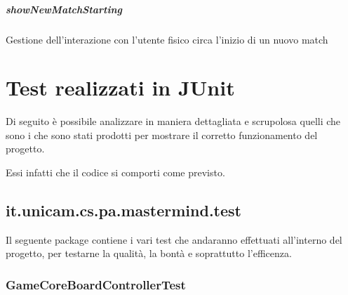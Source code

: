 \documentclass[letterpaper,10pt,italian,openany,oneside]{sphinxmanual}
\begin{document}
\paragraph{showNewMatchStarting}
\label{\detokenize{source/it/unicam/cs/pa/mastermind/ui/StartView:shownewmatchstarting}}

\begin{fulllineitems}
\label{\detokenize{source/it/unicam/cs/pa/mastermind/ui/StartView:it.unicam.cs.pa.mastermind.ui.StartView.showNewMatchStarting()}}
Gestione dell’interazione con l’utente fisico circa l’inizio di un nuovo match

\end{fulllineitems}



\chapter{Test realizzati in JUnit}
\label{\detokenize{test/packages:test-realizzati-in-junit}}\label{\detokenize{test/packages::doc}}
Di seguito è possibile analizzare in maniera dettagliata e scrupolosa quelli che sono
i  che sono stati prodotti per mostrare il corretto funzionamento del progetto.

Essi infatti  che il codice si comporti come previsto.


\section{it.unicam.cs.pa.mastermind.test}
\label{\detokenize{test/it/unicam/cs/pa/mastermind/test/package-index:it-unicam-cs-pa-mastermind-test}}\label{\detokenize{test/it/unicam/cs/pa/mastermind/test/package-index::doc}}
Il seguente package contiene i vari test che andaranno effettuati all’interno del progetto, per testarne la qualità, la bontà e soprattutto l’efficenza.

\label{\detokenize{test/it/unicam/cs/pa/mastermind/test/package-index:package-it.unicam.cs.pa.mastermind.test}}

\subsection{GameCoreBoardControllerTest}
\label{\detokenize{test/it/unicam/cs/pa/mastermind/test/GameCoreBoardControllerTest:gamecoreboardcontrollertest}}\label{\detokenize{test/it/unicam/cs/pa/mastermind/test/GameCoreBoardControllerTest::doc}}
\end{document}

